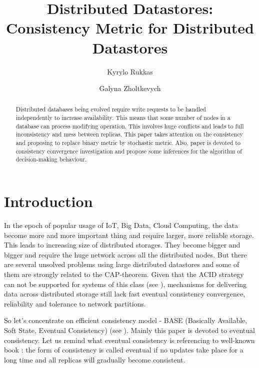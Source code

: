 \documentclass{llncs}
\begin{document}
\title{Distributed Datastores: Consistency Metric for Distributed Datastores}
\author{Kyrylo Rukkas\and Galyna Zholtkevych}
\maketitle
\begin{abstract}
Distributed databases being evolved require write requests to be handled independently to increase availability.
This means that some number of nodes in a database can process modifying operation. This involves huge conflicts and leads to full inconsistency and mess between replicas. This paper takes attention on the consistency and proposing to replace binary metric by stochastic metric. Also, paper is devoted to 
consistency convergence investigation and propose some inferences for the algorithm of decision-making behaviour.
\end{abstract}

\section{Introduction}\label{sec:intro}
In the epoch of popular usage of IoT, Big Data, Cloud Computing, the data become more and more important thing and require larger, more reliable storage. This leads to increasing size of distributed storages. They become bigger and bigger and require the huge network across all the distributed nodes.
But there are several unsolved problems using large distributed datastores and some of them are strongly related to the CAP-theorem. 
Given that the ACID strategy can not be supported for systems of this class (see \cite{bib:brewer}), mechanisms for delivering data across distributed storage still lack fast eventual consistency convergence, reliability and tolerance to network partitions.

So let's concentrate on efficient consistency model - BASE (Basically Available, Soft State, Eventual Consistency) (see \cite{bib:acid_vs_base}).
Mainly this paper is devoted to eventual consistency. Let us remind what eventual consistency is referencing to well-known book \cite{bib:tanenbaum}: the form of consistency is called eventual if no updates take place for a long time and all replicas will gradually become consistent.
\end{document}
